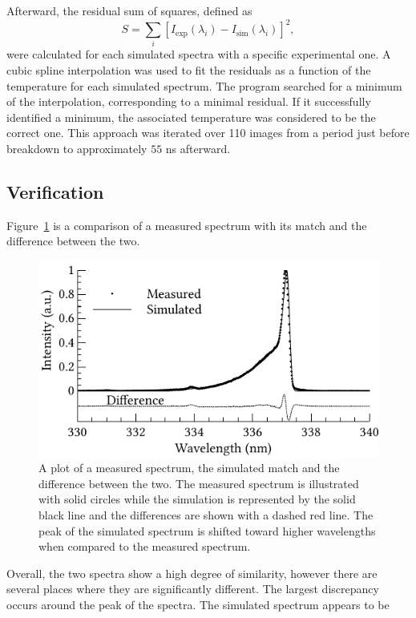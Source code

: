 Afterward, the residual sum of squares, defined as
\begin{equation}
  S = \sum_i \left[I_\mathrm{exp}(\lambda_i) - I_\mathrm{sim}(\lambda_i)\right]^2,
\end{equation}
were calculated for each simulated spectra with a specific experimental one. A
cubic spline interpolation was used to fit the residuals as a function of the
temperature for each simulated spectrum. The program searched for a minimum of
the interpolation, corresponding to a minimal residual. If it successfully
identified a minimum, the associated temperature was considered to be the
correct one. This approach was iterated over 110 images from a period just
before breakdown to approximately $55$ ns afterward.

\subsection{Verification}
Figure~\ref{fig:comparison} is a comparison of a measured spectrum with its
match and the difference between the two.
\begin{figure}
  \centering
  \includegraphics{./chapters/nasa/figures/comparison.pdf}
  \caption{A plot of a measured spectrum, the simulated match and the difference
    between the two. The measured spectrum is illustrated with solid circles while
    the simulation is represented by the solid black line and the differences are
    shown with a dashed red line. The peak of the simulated spectrum is shifted
    toward higher wavelengths when compared to the measured spectrum.}
  \label{fig:comparison}
\end{figure}
Overall, the two spectra show a high degree of similarity, however there are
several places where they are significantly different. The largest discrepancy
occurs around the peak of the spectra. The simulated spectrum appears to be
